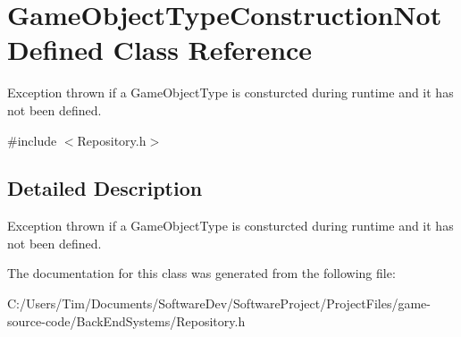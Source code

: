 \hypertarget{class_game_object_type_construction_not_defined}{}\section{Game\+Object\+Type\+Construction\+Not\+Defined Class Reference}
\label{class_game_object_type_construction_not_defined}


Exception thrown if a Game\+Object\+Type is consturcted during runtime and it has not been defined.  




{\ttfamily \#include $<$Repository.\+h$>$}



\subsection{Detailed Description}
Exception thrown if a Game\+Object\+Type is consturcted during runtime and it has not been defined. 

The documentation for this class was generated from the following file\+:\begin{DoxyCompactItemize}
\item 
C\+:/\+Users/\+Tim/\+Documents/\+Software\+Dev/\+Software\+Project/\+Project\+Files/game-\/source-\/code/\+Back\+End\+Systems/Repository.\+h\end{DoxyCompactItemize}
